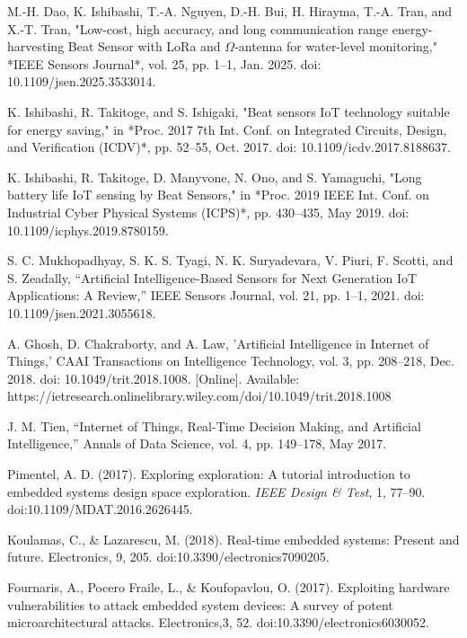 \documentclass[conference]{IEEEtran}
\begin{document}
\begin{thebibliography}{00}
M.-H. Dao, K. Ishibashi, T.-A. Nguyen, D.-H. Bui, H. Hirayma, T.-A. Tran, and X.-T. Tran, 
"Low-cost, high accuracy, and long communication range energy-harvesting Beat Sensor with LoRa and $\Omega$-antenna for water-level monitoring,"
*IEEE Sensors Journal*, vol. 25, pp. 1--1, Jan. 2025. doi: 10.1109/jsen.2025.3533014.

K. Ishibashi, R. Takitoge, and S. Ishigaki, 
"Beat sensors IoT technology suitable for energy saving," 
in *Proc. 2017 7th Int. Conf. on Integrated Circuits, Design, and Verification (ICDV)*, pp. 52--55, Oct. 2017. doi: 10.1109/icdv.2017.8188637.

K. Ishibashi, R. Takitoge, D. Manyvone, N. Ono, and S. Yamaguchi, 
"Long battery life IoT sensing by Beat Sensors," 
in *Proc. 2019 IEEE Int. Conf. on Industrial Cyber Physical Systems (ICPS)*, pp. 430--435, May 2019. doi: 10.1109/icphys.2019.8780159.

 S. C. Mukhopadhyay, S. K. S. Tyagi, N. K. Suryadevara, V. Piuri, F. Scotti, and S. Zeadally, 
``Artificial Intelligence-Based Sensors for Next Generation IoT Applications: A Review,'' 
IEEE Sensors Journal, vol. 21, pp. 1--1, 2021. doi: 10.1109/jsen.2021.3055618.

 A. Ghosh, D. Chakraborty, and A. Law, 
'Artificial Intelligence in Internet of Things,' 
CAAI Transactions on Intelligence Technology, vol. 3, pp. 208--218, Dec. 2018. doi: 10.1049/trit.2018.1008. [Online]. Available: https://ietresearch.onlinelibrary.wiley.com/doi/10.1049/trit.2018.1008

 J. M. Tien, 
``Internet of Things, Real-Time Decision Making, and Artificial Intelligence,'' 
Annals of Data Science, vol. 4, pp. 149--178, May 2017.

Pimentel, A. D. (2017). Exploring exploration: A tutorial introduction to embedded systems design space exploration. \textit{IEEE Design \& Test}, 1, 77--90. doi:10.1109/MDAT.2016.2626445.

Koulamas, C., \& Lazarescu, M. (2018). Real-time embedded systems: Present and future. Electronics, 9, 205. doi:10.3390/electronics7090205.

Fournaris, A., Pocero Fraile, L., \& Koufopavlou, O. (2017). Exploiting hardware vulnerabilities to attack embedded system devices: A survey of potent microarchitectural attacks. Electronics,3, 52. doi:10.3390/electronics6030052.

\end{thebibliography}
\end{document}
